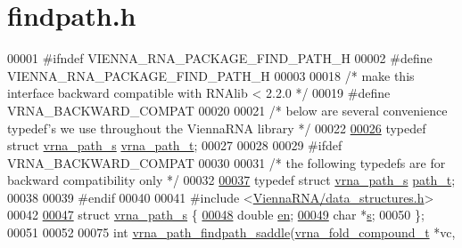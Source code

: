 \hypertarget{findpath_8h_source}{}\section{findpath.\+h}
\label{findpath_8h_source}

\begin{DoxyCode}
00001 \textcolor{preprocessor}{#ifndef VIENNA\_RNA\_PACKAGE\_FIND\_PATH\_H}
00002 \textcolor{preprocessor}{#define VIENNA\_RNA\_PACKAGE\_FIND\_PATH\_H}
00003 
00018 \textcolor{comment}{/* make this interface backward compatible with RNAlib < 2.2.0 */}
00019 \textcolor{preprocessor}{#define VRNA\_BACKWARD\_COMPAT}
00020 
00021 \textcolor{comment}{/* below are several convenience typedef's we use throughout the ViennaRNA library */}
00022 
\hyperlink{group__direct__paths_ga818d4f3d1cf8723d6905990b08d909fe}{00026} \textcolor{keyword}{typedef} \textcolor{keyword}{struct }\hyperlink{group__direct__paths_structvrna__path__s}{vrna\_path\_s} \hyperlink{group__direct__paths_structvrna__path__s}{vrna\_path\_t};
00027 
00028 
00029 \textcolor{preprocessor}{#ifdef VRNA\_BACKWARD\_COMPAT}
00030 
00031 \textcolor{comment}{/* the following typedefs are for backward compatibility only */}
00032 
\hyperlink{group__direct__paths_gab6b8737d5377e70a7815d04aae7fd884}{00037} \textcolor{keyword}{typedef} \textcolor{keyword}{struct }\hyperlink{group__direct__paths_structvrna__path__s}{vrna\_path\_s} \hyperlink{group__direct__paths_structvrna__path__s}{path\_t};
00038 
00039 \textcolor{preprocessor}{#endif}
00040 
00041 \textcolor{preprocessor}{#include <\hyperlink{data__structures_8h}{ViennaRNA/data\_structures.h}>}
00042 
\hyperlink{group__direct__paths}{00047} \textcolor{keyword}{struct }\hyperlink{group__direct__paths_structvrna__path__s}{vrna\_path\_s} \{
\hyperlink{group__direct__paths_ac25160bf31d28097358278f367e41227}{00048}   \textcolor{keywordtype}{double}  \hyperlink{group__direct__paths_ac25160bf31d28097358278f367e41227}{en}; 
\hyperlink{group__direct__paths_a141b70a59cb81d10bc65bbb7a0f6db77}{00049}   \textcolor{keywordtype}{char}    *\hyperlink{group__direct__paths_a141b70a59cb81d10bc65bbb7a0f6db77}{s}; 
00050 \};
00051 
00052 
00075 \textcolor{keywordtype}{int} \hyperlink{group__direct__paths_ga957922acc1bcaa97f52cbd0975f7dcd0}{vrna\_path\_findpath\_saddle}(\hyperlink{group__fold__compound_structvrna__fc__s}{vrna\_fold\_compound\_t}  *vc,

\end{DoxyCode}
